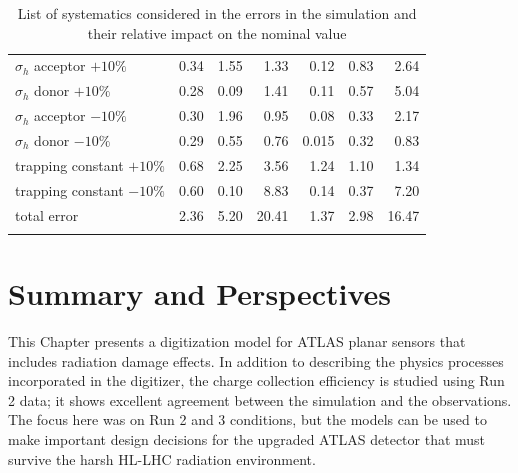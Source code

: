 \begin{table}[!htpb]
\begin{center}
{\begin{tabular*}{0.7\textwidth}{@{\extracolsep{\fill}}lrrrrrr}
$\sigma_h$ acceptor $+10\%$  	& 0.34  	& 1.55  & 1.33 & 0.12 & 0.83  & 2.64\\
$\sigma_h$  donor $+10\%$  		& 0.28  	& 0.09  & 1.41 & 0.11 & 0.57  &5.04\\
$\sigma_h$  acceptor $-10\%$  	& 0.30  	& 1.96  & 0.95 & 0.08 & 0.33  &2.17\\
$\sigma_h$  donor $-10\%$ 			& 0.29  	& 0.55  & 0.76 & 0.015  & 0.32  &0.83 \\
\noalign{\smallskip}\hline\noalign{\smallskip}
trapping constant $+10\%$ 			& 0.68  	& 2.25  & 3.56 & 1.24 & 1.10 & 1.34 \\
trapping constant $-10\%$  			& 0.60  	& 0.10  & 8.83 & 0.14 & 0.37 &  7.20\\
\noalign{\smallskip}\hline\noalign{\smallskip}
total error 					& 2.36		& 5.20 & 20.41 & 1.37 & 2.98  &16.47\\
\noalign{\smallskip}\hline\noalign{\smallskip}
\end{tabular*}
   \caption{List of systematics considered in the errors in the simulation and their relative impact on the nominal value}
   \label{tab:SystError}
}
\end{center}

\end{table} 




\section{Summary and Perspectives}
\label{sec:digiconclusions}



This Chapter presents a digitization model for ATLAS planar  sensors that includes radiation damage effects.  In addition to describing the physics processes incorporated in the digitizer, the charge 
collection efficiency is studied using Run 2 data; it shows excellent agreement between the simulation and the observations. The focus here was on Run 2 and 3 conditions, but the models can be used to make important design decisions for the upgraded ATLAS detector that must survive the harsh HL-LHC radiation environment.


